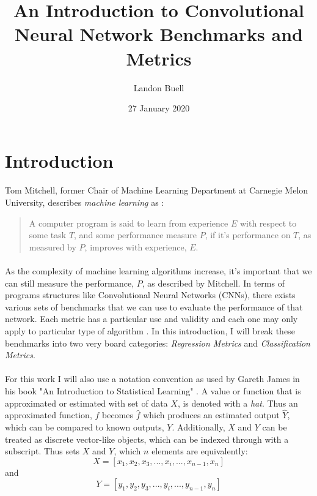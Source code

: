 \documentclass[12pt,letterpaper]{article}
\begin{document}

\title{An Introduction to Convolutional Neural Network Benchmarks and Metrics}
\author{Landon Buell}
\date{27 January 2020}
\maketitle


\section{Introduction}
\paragraph*{}Tom Mitchell, former Chair of Machine Learning Department at Carnegie Melon University, describes \textit{machine learning} as \cite{Geron}:
\begin{quote}
A computer program is said to learn from experience $E$ with respect to some task $T$, and some performance measure $P$, if it's performance on $T$, as measured by $P$, improves with experience, $E$. 
\end{quote}
\paragraph*{}As the complexity of machine learning algorithms increase, it's important that we can still measure the performance, $P$, as described by Mitchell. In terms of programs structures like Convolutional Neural Networks (CNNs), there exists various sets of benchmarks that we can use to evaluate the performance of that network. Each metric has a particular use and validity and each one may only apply to particular type of algorithm \cite{Olson}. In this introduction, I will break these benchmarks into two very board categories: \textit{Regression Metrics} and \textit{Classification Metrics}.
\paragraph*{}For this work I will also use a notation convention as used by Gareth James in his book "An Introduction to Statistical Learning" \cite{James}. A value or function that is approximated or estimated with  set of data $X$, is denoted with a \textit{hat}. Thus an approximated function, $f$ becomes $\hat{f}$ which produces an estimated output $\hat{Y}$, which can be compared to known outputs, $Y$. Additionally, $X$ and $Y$ can be treated as discrete vector-like objects, which can be indexed through with a subscript. Thus sets $X$ and $Y$, which $n$ elements are equivalently:
\begin{equation}
X = [x_1, x_2 , x_3 , ... , x_i , ... , x_{n-1} , x_n]
\end{equation}
and
\begin{equation}
Y = [y_1, y_2 , y_3 , ... , y_i , ... , y_{n-1} , y_n]
\end{equation}
\end{document}
